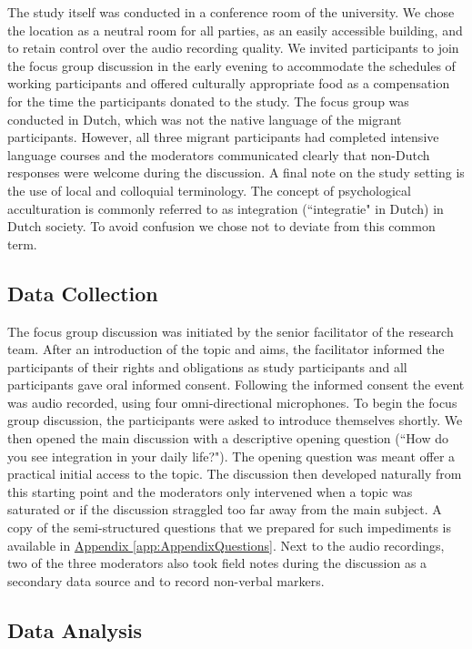 \documentclass[man, 12pt, a4paper]{apa7}
\begin{document}
The study itself was conducted in a conference room of the university. We chose the location as a neutral room for all parties, as an easily accessible building, and to retain control over the audio recording quality. We invited participants to join the focus group discussion in the early evening to accommodate the schedules of working participants and offered culturally appropriate food as a compensation for the time the participants donated to the study. The focus group was conducted in Dutch, which was not the native language of the migrant participants. However, all three migrant participants had completed intensive language courses and the moderators communicated clearly that non-Dutch responses were welcome during the discussion. A final note on the study setting is the use of local and colloquial terminology. The concept of psychological acculturation is commonly referred to as integration (``integratie" in Dutch) in Dutch society. To avoid confusion we chose not to deviate from this common term. 

\subsection{Data Collection}

The focus group discussion was initiated by the senior facilitator of the research team. After an introduction of the topic and aims, the facilitator informed the participants of their rights and obligations as study participants and all participants gave oral informed consent. Following the informed consent the event was audio recorded, using four omni-directional microphones. To begin the focus group discussion, the participants were asked to introduce themselves shortly. We then opened the main discussion with a descriptive opening question (``How do you see integration in your daily life?"). The opening question was meant offer a practical initial access to the topic. The discussion then developed naturally from this starting point and the moderators only intervened when a topic was saturated or if the discussion straggled too far away from the main subject. A copy of the semi-structured questions that we prepared for such impediments is available in \hyperref[app:AppendixQuestions]{Appendix \ref*{app:AppendixQuestions}}. Next to the audio recordings, two of the three moderators also took field notes during the discussion as a secondary data source and to record non-verbal markers.

\subsection{Data Analysis}
\end{document}

